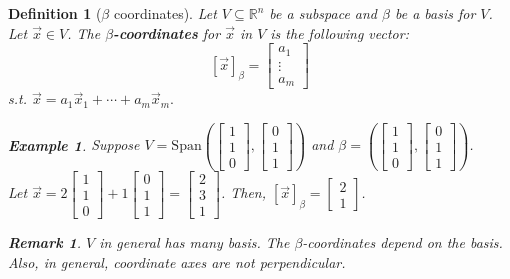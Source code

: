 \documentclass[12pt, a4paper]{article}
\newtheorem{df}{Definition}[subsection]
\newtheorem{eg}{Example}[subsection]
\newtheorem*{rmk}{\indent Remark}
\def\R{{\mathbb{R}}}
\def\Span{\mathrm{Span}}
\def\vecx{\vec{x}}
\begin{document}
\begin{df}[$\beta$ coordinates]
	Let	$V\subseteq\R^n$ be a subspace and $\beta$ be a basis for $V$. Let $\vecx\in V$. The $\beta$\textbf{-coordinates} for $\vecx$ in $V$ is the following vector: \[\left[\vecx\right]_\beta=\begin{bmatrix}a_1\\\vdots\\a_m\end{bmatrix}\] \emph{s.t.} $\vecx=a_1\vecx_1+\cdots+a_m\vecx_m.$
	\begin{eg}
		Suppose $V=\Span\left(\begin{bmatrix}1\\1\\0\end{bmatrix},\begin{bmatrix}0\\1\\1\end{bmatrix}\right)$ and $\beta=\left(\begin{bmatrix}1\\1\\0\end{bmatrix}, \begin{bmatrix}0\\1\\1\end{bmatrix}\right)$.\\
		Let $\vecx=2\begin{bmatrix}1\\1\\0\end{bmatrix}+1\begin{bmatrix}0\\1\\1\end{bmatrix}=\begin{bmatrix}2\\3\\1\end{bmatrix}$. 
		Then, $[\vecx]_\beta=\begin{bmatrix}2\\1\end{bmatrix}$.
	\end{eg}
	\begin{rmk} 
		$V$ in general has many basis. The $\beta$-coordinates depend on the basis. Also, in general, coordinate axes are not perpendicular. 
	\end{rmk}
\end{df}
\end{document}
